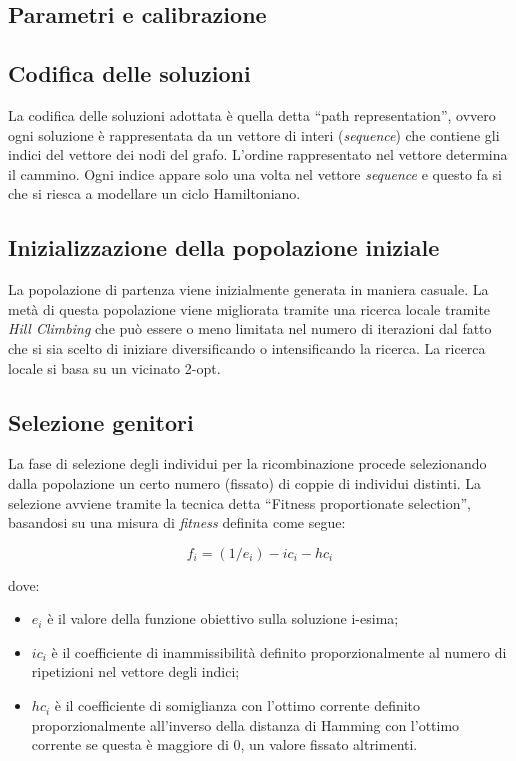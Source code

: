 \documentclass[12pt,a4paper]{article}
\begin{document}
        \subsection{Parametri e calibrazione}

        \subsection{Codifica delle soluzioni}
            La codifica delle soluzioni adottata \`e quella detta ``path representation'', ovvero
            ogni soluzione \`e rappresentata da un vettore di interi (\emph{sequence}) che contiene
            gli indici del vettore dei nodi del grafo. L'ordine rappresentato nel vettore determina il cammino.
            Ogni indice appare solo una volta nel vettore \emph{sequence} e questo fa si che si riesca a modellare
            un ciclo Hamiltoniano.

        \subsection{Inizializzazione della popolazione iniziale}
            La popolazione di partenza viene inizialmente generata in maniera casuale. La met\`a di questa popolazione
            viene migliorata tramite una ricerca locale tramite \emph{Hill Climbing} che pu\`o essere o meno limitata
            nel numero di iterazioni dal fatto che si sia scelto di iniziare diversificando o intensificando la ricerca.
            La ricerca locale si basa su un vicinato 2-opt.

        \subsection{Selezione genitori}
            La fase di selezione degli individui per la ricombinazione procede selezionando dalla popolazione un certo numero
            (fissato) di coppie di individui distinti.
            La selezione avviene tramite la tecnica detta ``Fitness proportionate selection'', basandosi su una misura di \emph{fitness}
            definita come segue:

            $$f_i = (1 / e_i) - ic_i - hc_i$$

            dove:
            \begin{itemize}
                \item $e_i$ \`e il valore della funzione obiettivo sulla soluzione i-esima;
                \item $ic_i$ \`e il coefficiente di inammissibilit\`a definito proporzionalmente
                    al numero di ripetizioni nel vettore degli indici;
                \item $hc_i$ \`e il coefficiente di somiglianza con l'ottimo corrente definito proporzionalmente
                    all'inverso della distanza di Hamming con l'ottimo corrente se questa \`e maggiore di 0, un valore
                    fissato altrimenti.
            \end{itemize}
\end{document}
